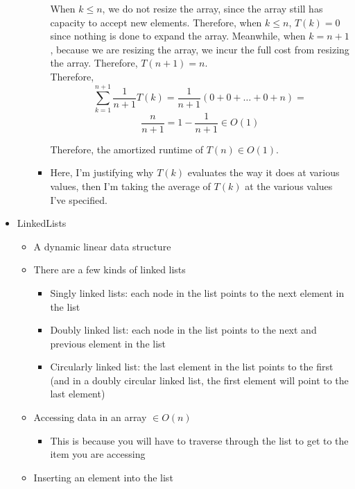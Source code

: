 \documentclass{article}
\begin{document}
\begin{itemize}
\begin{itemize}
\begin{itemize}
                        When $k \leq n$, we do not resize the array, since the array still has capacity to accept new elements. Therefore, when $k \leq n$, $T(k) = 0$ since nothing is done to expand the array. Meanwhile, when $k = n + 1$, because we are resizing the array, we incur the full cost from resizing the array. Therefore, $T(n + 1) = n$. \\

                        Therefore,
                        $$\sum_{k = 1}^{n + 1} \frac{1}{n + 1}T(k) = \frac{1}{n + 1}(0 + 0 + \ldots + 0 + n) =$$
                        $$ \frac{n}{n + 1} = 1 - \frac{1}{n + 1} \in O(1)$$

                        Therefore, the amortized runtime of $T(n) \in O(1)$.
                    \item Here, I'm justifying why $T(k)$ evaluates the way it does at various values, then I'm taking the average of $T(k)$ at the various values I've specified.
                \end{itemize}
        \end{itemize}
    \item LinkedLists
        \begin{itemize}
            \item A dynamic linear data structure
            \item There are a few kinds of linked lists
                \begin{itemize}
                    \item Singly linked lists: each node in the list points to the next element in the list
                    \item Doubly linked list: each node in the list points to the next and previous element in the list
                    \item Circularly linked list: the last element in the list points to the first (and in a doubly circular linked list, the first element will point to the last element)
                \end{itemize}
            \item Accessing data in an array $\in O(n)$
                \begin{itemize}
                    \item This is because you will have to traverse through the list to get to the item you are accessing
                \end{itemize}
            \item Inserting an element into the list

\end{itemize}
\end{itemize}
\end{document}
